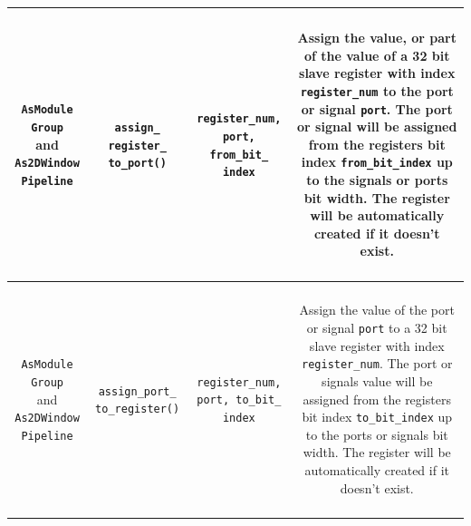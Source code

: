 \begin{longtable}[htbp]{|c|c|c|c|}
\hline
\parbox{2.5cm}{~\\ \texttt{AsModule Group} \\ and\\ \texttt{As2DWindow Pipeline}\\~} & \parbox{3cm}{~\\ \texttt{assign\_ register\_ to\_port()}\\~} & \parbox{3cm}{~ \\ \texttt{register\_num, port, from\_bit\_ index} \\ ~} & \parbox{6cm}{~\\ Assign the value, or part of the value of a 32 bit slave register with index \texttt{register\_num} to the port or signal \texttt{port}. The port or signal will be assigned from the registers bit index \texttt{from\_bit\_index} up to the signals or ports bit width. The register will be automatically created if it doesn't exist. \\~}\\
\hline
\parbox{2.5cm}{~\\ \texttt{AsModule Group} \\ and\\ \texttt{As2DWindow Pipeline}\\~} & \parbox{3cm}{~\\ \texttt{assign\_port\_ to\_register()}\\~} & \parbox{3cm}{~ \\ \texttt{register\_num, port, to\_bit\_ index} \\ ~} & \parbox{6cm}{~\\ Assign the value of the port or signal \texttt{port} to a 32 bit slave register with index \texttt{register\_num}. The port or signals value will be assigned from the registers bit index \texttt{to\_bit\_index} up to the ports or signals bit width. The register will be automatically created if it doesn't exist. \\~}\\
\hline

\end{longtable}
